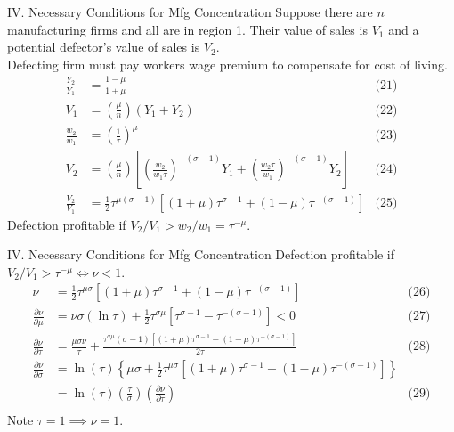 \documentclass[10pt,notes=hide]{beamer}
\begin{document}
\begin{frame}{IV. Necessary Conditions for Mfg Concentration}
Suppose there are $n$ manufacturing firms and all are in region 1.
Their value of sales is $V_1$ and a potential defector's value of sales is $V_2$. \\
Defecting firm must pay workers wage premium to compensate for cost of living.
\begin{align*}
\frac{Y_2}{Y_1} 
&=
\frac{1-\mu}{1+\mu}
& \text{(21)} \\
V_1 
&=
\left(\frac{\mu}{n}\right) \left(Y_1+Y_2\right)
& \text{(22)} \\
\frac{w_2}{w_1} 
&=
\left(\frac{1}{\tau}\right)^{\mu}
& \text{(23)} \\
V_2 
&=
\left(\frac{\mu}{n}\right)\left[\left(\frac{w_2}{w_1 \tau}\right)^{-(\sigma-1)}Y_1 + \left(\frac{w_2 \tau}{w_1}\right)^{-(\sigma-1)}Y_2 \right]
& \text{(24)} \\
\frac{V_2}{V_1} 
&=
\frac{1}{2} \tau^{\mu(\sigma-1)}\left[\left(1+\mu\right)\tau^{\sigma-1} + (1-\mu)\tau^{-(\sigma-1)}\right]
& \text{(25)}
\end{align*}
Defection profitable if $V_2/V_1 > w_2 / w_1 = \tau^{-\mu}$.
\end{frame}
\begin{frame}{IV. Necessary Conditions for Mfg Concentration}
Defection profitable if $V_2/V_1 > \tau^{-\mu} \iff \nu <1$.
\begin{align*}
\nu 
&=
\frac{1}{2} \tau^{\mu\sigma}\left[\left(1+\mu\right)\tau^{\sigma-1} + (1-\mu)\tau^{-(\sigma-1)}\right]
& \text{(26)} \\
\frac{\partial\nu}{\partial\mu} 
&=
\nu\sigma(\ln\tau) + \frac{1}{2}\tau^{\sigma\mu} \left[\tau^{\sigma-1} - \tau^{-(\sigma-1)}\right]
< 0
& \text{(27)} \\
\frac{\partial\nu}{\partial\tau} 
&=
\frac{\mu\sigma\nu}{\tau} + \frac{\tau^{\sigma\mu}(\sigma-1)\left[\left(1+\mu\right)\tau^{\sigma-1} - (1-\mu)\tau^{-(\sigma-1)}\right]}{2\tau}
& \text{(28)} \\
\frac{\partial\nu}{\partial\sigma} 
&=
\ln(\tau) \left\{\mu\sigma + \frac{1}{2}\tau^{\mu\sigma}\left[\left(1+\mu\right)\tau^{\sigma-1} - (1-\mu)\tau^{-(\sigma-1)}\right]\right\}
\\
&= \ln(\tau) \left(\frac{\tau}{\sigma}\right) \left(\frac{\partial \nu}{\partial \tau}\right)
& \text{(29)} \\
\end{align*}
Note $\tau=1\implies\nu=1$.
\end{frame}
\end{document}
